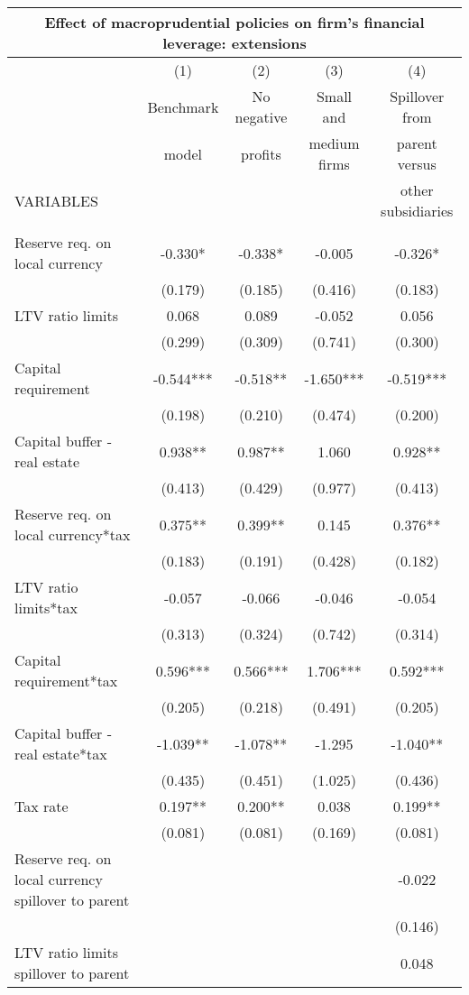 \begin{tabular}{lcccc}
\multicolumn{5}{c}{Effect of macroprudential policies on firm's financial leverage: extensions} \\ \hline
 & (1) & (2) & (3) & (4) \\
 & Benchmark & No negative & Small and & Spillover from \\
 & model & profits & medium firms & parent versus \\
VARIABLES &  &  &  & other subsidiaries \\ \hline
 &  &  &  &  \\
Reserve req. on local currency & -0.330* & -0.338* & -0.005 & -0.326* \\
 & (0.179) & (0.185) & (0.416) & (0.183) \\
LTV ratio limits & 0.068 & 0.089 & -0.052 & 0.056 \\
 & (0.299) & (0.309) & (0.741) & (0.300) \\
Capital requirement & -0.544*** & -0.518** & -1.650*** & -0.519*** \\
 & (0.198) & (0.210) & (0.474) & (0.200) \\
Capital buffer - real estate & 0.938** & 0.987** & 1.060 & 0.928** \\
 & (0.413) & (0.429) & (0.977) & (0.413) \\
Reserve req. on local currency*tax & 0.375** & 0.399** & 0.145 & 0.376** \\
 & (0.183) & (0.191) & (0.428) & (0.182) \\
LTV ratio limits*tax & -0.057 & -0.066 & -0.046 & -0.054 \\
 & (0.313) & (0.324) & (0.742) & (0.314) \\
Capital requirement*tax & 0.596*** & 0.566*** & 1.706*** & 0.592*** \\
 & (0.205) & (0.218) & (0.491) & (0.205) \\
Capital buffer - real estate*tax & -1.039** & -1.078** & -1.295 & -1.040** \\
 & (0.435) & (0.451) & (1.025) & (0.436) \\
Tax rate & 0.197** & 0.200** & 0.038 & 0.199** \\
 & (0.081) & (0.081) & (0.169) & (0.081) \\
Reserve req. on local currency spillover to parent &  &  &  & -0.022 \\
 &  &  &  & (0.146) \\
LTV ratio limits spillover to parent &  &  &  & 0.048 \\

\end{tabular}

